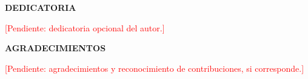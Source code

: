 \begin{center}
    \textbf{\fontsize{14}{16}\selectfont DEDICATORIA}\\
\end{center}
\vspace{10pt}

{
    \setlength{\parindent}{3em}
    \hspace{1pt}
    \fontsize{12}{14}\selectfont

    \textcolor{red}{[Pendiente: dedicatoria opcional del autor.]}

}

\newpage

\begin{center}
    \textbf{\fontsize{14}{16}\selectfont AGRADECIMIENTOS}\\
\end{center}
\vspace{10pt}
\fontsize{12}{14}\selectfont

{
    \setlength{\parindent}{3em}
    \hspace{1pt}

    \textcolor{red}{[Pendiente: agradecimientos y reconocimiento de contribuciones, si corresponde.]}

}
